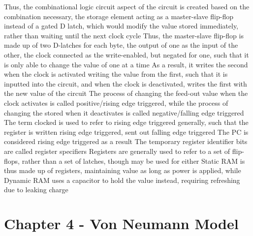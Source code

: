 \documentclass[11 pt, twoside]{article}
\newenvironment{outline*}
{
	\begin{outline}[enumerate]
	}
	{\end{outline}
}
\begin{document}
\begin{outline*}
\1 Thus, the combinational logic circuit aspect of the circuit is created based on the combination necessary, the storage element acting as a master-slave flip-flop instead of a gated D latch, which would modify the value stored immediately, rather than waiting until the next clock cycle
\2 Thus, the master-slave flip-flop is made up of two D-latches for each byte, the output of one as the input of the other, the clock connected as the write-enabled, but negated for one, such that it is only able to change the value of one at a time
\2 As a result, it writes the second when the clock is activated writing the value from the first, such that it is inputted into the circuit, and when the clock is deactivated, writes the first with the new value of the circuit
\3 The process of changing the feed-out value when the clock activates is called positive/rising edge triggered, while the process of changing the stored when it deactivates is called negative/falling edge triggered
\3 The term clocked is used to refer to rising edge triggered generally, such that the register is written rising edge triggered, sent out falling edge triggered
\4 The PC is considered rising edge triggered as a result
\3 The temporary register identifier bits are called register specifiers
\2 Registers are generally used to refer to a set of flip-flops, rather than a set of latches, though may be used for either
\1 Static RAM is thus made up of registers, maintaining value as long as power is applied, while Dynamic RAM uses a capacitor to hold the value instead, requiring refreshing due to leaking charge
\end{outline*}
\section{Chapter 4 - Von Neumann Model}
\end{document}
